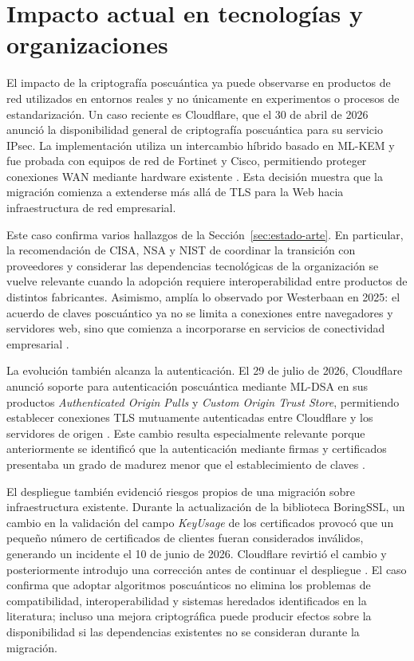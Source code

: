 \section{Impacto actual en tecnologías y organizaciones}
\label{sec:impacto}

El impacto de la criptografía poscuántica ya puede observarse en productos de red utilizados en entornos reales y no únicamente en experimentos o procesos de estandarización. Un caso reciente es Cloudflare, que el 30 de abril de 2026
anunció la disponibilidad general de criptografía poscuántica para su servicio IPsec. La implementación utiliza un intercambio híbrido basado en ML-KEM y fue probada con equipos de red de Fortinet y Cisco, permitiendo proteger conexiones
WAN mediante hardware existente \cite{goldberg2026ipsec}. Esta decisión muestra que la migración comienza a extenderse más allá de TLS para la Web hacia infraestructura de red empresarial.

Este caso confirma varios hallazgos de la Sección~\ref{sec:estado-arte}.
En particular, la recomendación de CISA, NSA y NIST de coordinar la transición con proveedores y considerar las dependencias tecnológicas de la organización \cite{cisa2023quantum} se vuelve relevante cuando la adopción requiere interoperabilidad entre productos de distintos fabricantes. Asimismo, amplía
lo observado por Westerbaan en 2025: el acuerdo de claves poscuántico ya no se limita a conexiones entre navegadores y servidores web, sino que comienza a incorporarse en servicios de conectividad empresarial
\cite{westerbaan2025postquantum,goldberg2026ipsec}.

La evolución también alcanza la autenticación. El 29 de julio de 2026, Cloudflare anunció soporte para autenticación poscuántica mediante ML-DSA en sus productos \textit{Authenticated Origin Pulls} y \textit{Custom Origin Trust Store}, permitiendo establecer conexiones TLS mutuamente autenticadas entre Cloudflare y los servidores de origen
\cite{valenta2026authentication}. Este cambio resulta especialmente relevante porque anteriormente se identificó que la autenticación mediante firmas y certificados presentaba un grado de madurez menor que el establecimiento de
claves \cite{westerbaan2025postquantum}.

El despliegue también evidenció riesgos propios de una migración sobre infraestructura existente. Durante la actualización de la biblioteca BoringSSL, un cambio en la validación del campo \textit{KeyUsage} de los certificados
provocó que un pequeño número de certificados de clientes fueran considerados inválidos, generando un incidente el 10 de junio de 2026. Cloudflare revirtió el cambio y posteriormente introdujo una corrección antes de continuar el despliegue \cite{valenta2026authentication}. El caso confirma que adoptar
algoritmos poscuánticos no elimina los problemas de compatibilidad, interoperabilidad y sistemas heredados identificados en la literatura; incluso una mejora criptográfica puede producir efectos sobre la disponibilidad si las
dependencias existentes no se consideran durante la migración.
